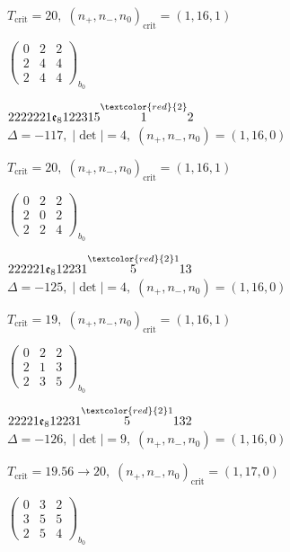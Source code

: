 \documentclass[10pt]{article}
\begin{document}
\hspace{1em}$T_{\text{crit}}=20,\; (n_+,n_-,n_0)_{\text{crit}}=(1,16,1)$

\hspace{2em}$\left(\begin{smallmatrix}0 & 2 & 2 \\ 2 & 4 & 4 \\ 2 & 4 & 4\end{smallmatrix}\right)_{\!b_0}$

\smallskip

$2222221\mathfrak{e}_8122315\overset{\textcolor{red}{2}}{1}2$ \quad $\Delta=-117,\; |\det|=4,\; (n_+,n_-,n_0)=(1,16,0)$

\hspace{1em}$T_{\text{crit}}=20,\; (n_+,n_-,n_0)_{\text{crit}}=(1,16,1)$

\hspace{2em}$\left(\begin{smallmatrix}0 & 2 & 2 \\ 2 & 0 & 2 \\ 2 & 2 & 4\end{smallmatrix}\right)_{\!b_0}$

\smallskip

$222221\mathfrak{e}_812231\overset{\textcolor{red}{2}1}{5}13$ \quad $\Delta=-125,\; |\det|=4,\; (n_+,n_-,n_0)=(1,16,0)$

\hspace{1em}$T_{\text{crit}}=19,\; (n_+,n_-,n_0)_{\text{crit}}=(1,16,1)$

\hspace{2em}$\left(\begin{smallmatrix}0 & 2 & 2 \\ 2 & 1 & 3 \\ 2 & 3 & 5\end{smallmatrix}\right)_{\!b_0}$

\smallskip

$22221\mathfrak{e}_812231\overset{\textcolor{red}{2}1}{5}132$ \quad $\Delta=-126,\; |\det|=9,\; (n_+,n_-,n_0)=(1,16,0)$

\hspace{1em}$T_{\text{crit}}=19.56 \to 20,\; (n_+,n_-,n_0)_{\text{crit}}=(1,17,0)$

\hspace{2em}$\left(\begin{smallmatrix}0 & 3 & 2 \\ 3 & 5 & 5 \\ 2 & 5 & 4\end{smallmatrix}\right)_{\!b_0}$
\end{document}
